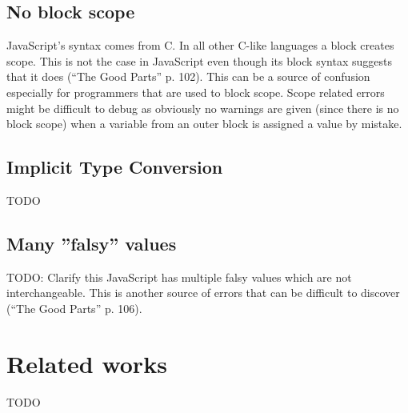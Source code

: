 	\subsection{No block scope} %
	\label{sub:no_block_scope}
		JavaScript's syntax comes from C. In all other C-like languages a block creates scope. This is not the case in JavaScript even though its block syntax suggests that it does (“The Good Parts” p. 102). This can be a source of confusion especially for programmers that are used to block scope. Scope related errors might be difficult to debug as obviously no warnings are given (since there is no block scope) when a variable from an outer block is assigned a value by mistake.

	\subsection{Implicit Type Conversion} %
	\label{sub:implicit_type_conversion}
	TODO

	\subsection{Many ''falsy'' values} %
	\label{sub:many_falsy_values}
		TODO: Clarify this
		JavaScript has multiple falsy values which are not interchangeable. This is another source of errors that can be difficult to discover (“The Good Parts” p. 106).

\section{Related works} %
\label{sec:related_works}
TODO

